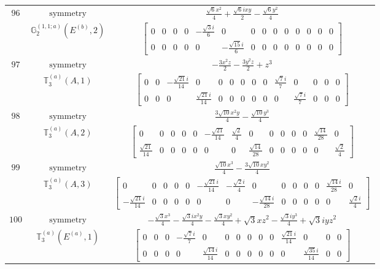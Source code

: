 \documentclass[fleqn,8pt,landscape]{jsarticle}
\begin{document}
\begin{longtable}{ccc}
$ 96 $ & $ \text{symmetry} $ & $ \frac{\sqrt{6} x^{2}}{4} + \frac{\sqrt{6} i x y}{2} - \frac{\sqrt{6} y^{2}}{4} $ \\
$  $ & $ \mathbb{G}_{2}^{(1,1;a)}(E^{(b)},2) $ & $ \begin{bmatrix} 0 & 0 & 0 & 0 & - \frac{\sqrt{3} i}{6} & 0 & 0 & 0 & 0 & 0 & 0 & 0 & 0 & 0 \\ 0 & 0 & 0 & 0 & 0 & - \frac{\sqrt{15} i}{6} & 0 & 0 & 0 & 0 & 0 & 0 & 0 & 0 \end{bmatrix} $ \\ \hline
$ 97 $ & $ \text{symmetry} $ & $ - \frac{3 x^{2} z}{2} - \frac{3 y^{2} z}{2} + z^{3} $ \\
$  $ & $ \mathbb{T}_{3}^{(a)}(A,1) $ & $ \begin{bmatrix} 0 & 0 & - \frac{\sqrt{21} i}{14} & 0 & 0 & 0 & 0 & 0 & 0 & \frac{\sqrt{7} i}{7} & 0 & 0 & 0 & 0 \\ 0 & 0 & 0 & \frac{\sqrt{21} i}{14} & 0 & 0 & 0 & 0 & 0 & 0 & \frac{\sqrt{7} i}{7} & 0 & 0 & 0 \end{bmatrix} $ \\ \hline
$ 98 $ & $ \text{symmetry} $ & $ \frac{3 \sqrt{10} x^{2} y}{4} - \frac{\sqrt{10} y^{3}}{4} $ \\
$  $ & $ \mathbb{T}_{3}^{(a)}(A,2) $ & $ \begin{bmatrix} 0 & 0 & 0 & 0 & 0 & - \frac{\sqrt{21}}{14} & \frac{\sqrt{2}}{4} & 0 & 0 & 0 & 0 & 0 & \frac{\sqrt{14}}{28} & 0 \\ \frac{\sqrt{21}}{14} & 0 & 0 & 0 & 0 & 0 & 0 & \frac{\sqrt{14}}{28} & 0 & 0 & 0 & 0 & 0 & \frac{\sqrt{2}}{4} \end{bmatrix} $ \\ \hline
$ 99 $ & $ \text{symmetry} $ & $ \frac{\sqrt{10} x^{3}}{4} - \frac{3 \sqrt{10} x y^{2}}{4} $ \\
$  $ & $ \mathbb{T}_{3}^{(a)}(A,3) $ & $ \begin{bmatrix} 0 & 0 & 0 & 0 & 0 & - \frac{\sqrt{21} i}{14} & - \frac{\sqrt{2} i}{4} & 0 & 0 & 0 & 0 & 0 & \frac{\sqrt{14} i}{28} & 0 \\ - \frac{\sqrt{21} i}{14} & 0 & 0 & 0 & 0 & 0 & 0 & - \frac{\sqrt{14} i}{28} & 0 & 0 & 0 & 0 & 0 & \frac{\sqrt{2} i}{4} \end{bmatrix} $ \\ \hline
$ 100 $ & $ \text{symmetry} $ & $ - \frac{\sqrt{3} x^{3}}{4} - \frac{\sqrt{3} i x^{2} y}{4} - \frac{\sqrt{3} x y^{2}}{4} + \sqrt{3} x z^{2} - \frac{\sqrt{3} i y^{3}}{4} + \sqrt{3} i y z^{2} $ \\
$  $ & $ \mathbb{T}_{3}^{(a)}(E^{(a)},1) $ & $ \begin{bmatrix} 0 & 0 & 0 & - \frac{\sqrt{7} i}{7} & 0 & 0 & 0 & 0 & 0 & 0 & \frac{\sqrt{21} i}{14} & 0 & 0 & 0 \\ 0 & 0 & 0 & 0 & \frac{\sqrt{14} i}{14} & 0 & 0 & 0 & 0 & 0 & 0 & \frac{\sqrt{35} i}{14} & 0 & 0 \end{bmatrix} $ \\ \hline

\end{longtable}
\end{document}
